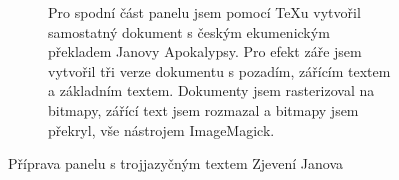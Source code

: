 \begin{figure}[p]
\begin{subfigure}{\linewidth}
\begin{verbatim}
\end{verbatim}
\endgroup
\par\vspace{1.5pt}
\centering
{}
\par\vspace{-1.5pt}
\caption{Pro spodní část panelu jsem pomocí \TeX u vytvořil samostatný dokument s českým ekumenickým překladem Janovy Apokalypsy. Pro efekt záře jsem vytvořil tři verze dokumentu s pozadím, zářícím textem a základním textem. Dokumenty jsem rasterizoval na bitmapy, zářící text jsem rozmazal a bitmapy jsem překryl, vše nástrojem ImageMagick.}
\label{fig:screen2-texts-czech}
\end{subfigure}
\caption{Příprava panelu s trojjazyčným textem Zjevení Janova}
\label{fig:screen2-texts}
\end{figure}